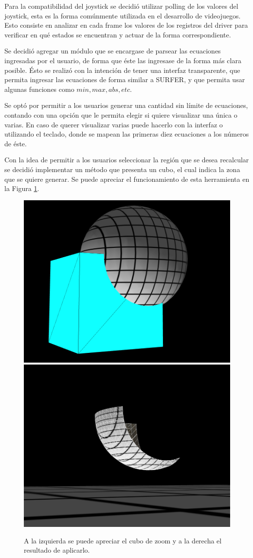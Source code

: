 \documentclass[12pt]{article}
\begin{document}
Para la compatibilidad del joystick se decidió utilizar polling de los valores del joystick, esta es la forma comúnmente utilizada en el desarrollo de videojuegos\cite{engine}. Esto consiste en analizar en cada frame los valores de los registros del driver para verificar en qué estados se encuentran y actuar de la forma correspondiente.

Se decidió agregar un módulo que se encargase de parsear las ecuaciones ingresadas por el usuario, de forma que éste las ingresase de la forma más clara posible. Ésto se realizó con la intención de tener una interfaz transparente, que permita ingresar las ecuaciones de forma similar a SURFER, y que permita usar algunas funciones como $min, max, abs, etc$.

Se optó por permitir a los usuarios generar una cantidad sin límite de ecuaciones, contando con una opción que le permita elegir si quiere visualizar una única o varias. En caso de querer visualizar varias puede hacerlo con la interfaz o utilizando el teclado, donde se mapean las primeras diez ecuaciones a los números de éste. 

Con la idea de permitir a los usuarios seleccionar la región que se desea recalcular se decidió implementar un método que presenta un cubo, el cual indica la zona que se quiere generar. Se puede apreciar el funcionamiento de esta herramienta en la Figura \ref{zoomCube}.
\begin{figure}[h!]
\includegraphics[width =0.45\linewidth]{cubo1.png}
\hfill
\includegraphics[width =0.45\linewidth]{cubo2.png}
\caption{ A la izquierda se puede apreciar el cubo de zoom y a la derecha el resultado de aplicarlo.}
\label{zoomCube}
\end{figure}
\clearpage
\end{document}
